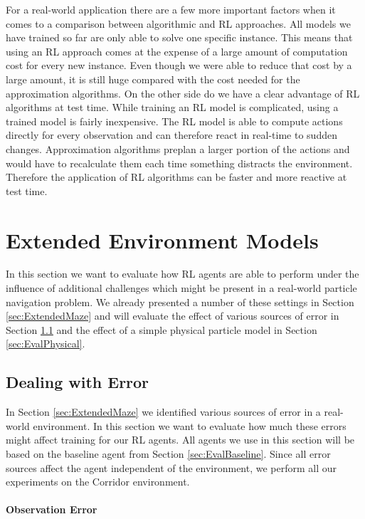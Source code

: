 For a real-world application there are a few more important factors when it comes to a comparison between algorithmic and RL approaches. All models we have trained so far are only able to solve one specific instance. This means that using an RL approach comes at the expense of a large amount of computation cost for every new instance. Even though we were able to reduce that cost by a large amount, it is still huge compared with the cost needed for the approximation algorithms. On the other side do we have a clear advantage of RL algorithms at test time. While training an RL model is complicated, using a trained model is fairly inexpensive. The RL model is able to compute actions directly for every observation and can therefore react in real-time to sudden changes. Approximation algorithms preplan a larger portion of the actions and would have to recalculate them each time something distracts the environment. Therefore the application of RL algorithms can be faster and more reactive at test time.

\section{Extended Environment Models} \label{sec:EvalExtendedModels}
In this section we want to evaluate how RL agents are able to perform under the influence of additional challenges which might be present in a real-world particle navigation problem. We already presented a number of these settings in Section \ref{sec:ExtendedMaze} and will evaluate the effect of various sources of error in Section \ref{sec:EvalError} and the effect of a simple physical particle model in Section \ref{sec:EvalPhysical}.

\subsection{Dealing with Error} \label{sec:EvalError}
In Section \ref{sec:ExtendedMaze} we identified various sources of error in a real-world environment. In this section we want to evaluate how much these errors might affect training for our RL agents. All agents we use in this section will be based on the baseline agent from Section \ref{sec:EvalBaseline}. Since all error sources affect the agent independent of the environment, we perform all our experiments on the Corridor environment.

\paragraph{Observation Error}


